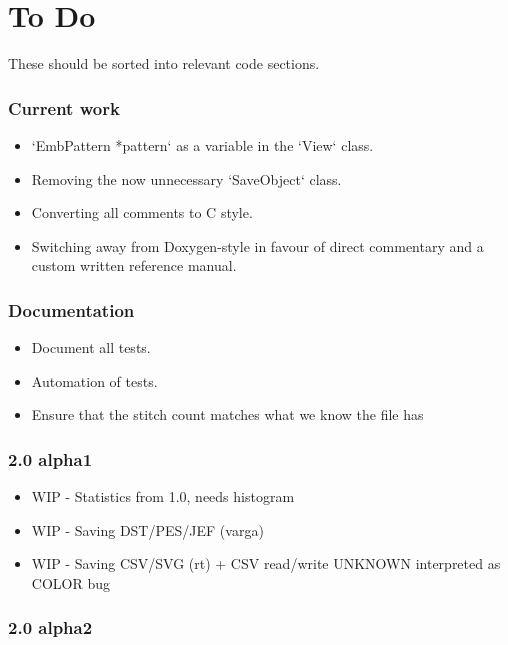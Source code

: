 \documentclass[a4paper]{report}
\begin{document}
\chapter{To Do}

These should be sorted into relevant code sections.

\subsection{Current work}

\begin{itemize}
\item `EmbPattern *pattern` as a variable in the `View` class.
\item Removing the now unnecessary `SaveObject` class.
\item Converting all comments to C style.
\item Switching away from Doxygen-style in favour of direct commentary and a custom written reference manual.
\end{itemize}

\subsection{Documentation}

\begin{itemize}
\item Document all tests.
\item Automation of tests.
\item Ensure that the stitch count matches what we know the file has
\end{itemize}

\subsection{2.0 alpha1}

\begin{itemize}
\item WIP - Statistics from 1.0, needs histogram
\item WIP - Saving DST/PES/JEF (varga)
\item WIP - Saving CSV/SVG (rt) + CSV read/write UNKNOWN interpreted as COLOR bug
\end{itemize}

\subsection{2.0 alpha2}
\end{document}
